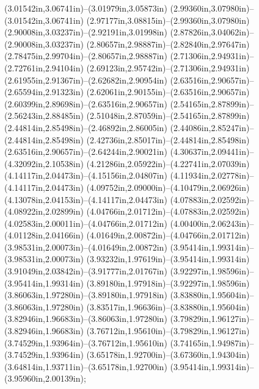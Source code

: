 (3.01542in,3.06741in)--(3.01979in,3.05873in) (2.99360in,3.07980in)--(3.01542in,3.06741in) (2.97177in,3.08815in)--(2.99360in,3.07980in) (2.90008in,3.03237in)--(2.92191in,3.01998in) (2.87826in,3.04062in)--(2.90008in,3.03237in) (2.80657in,2.98887in)--(2.82840in,2.97647in) (2.78475in,2.99704in)--(2.80657in,2.98887in) (2.71306in,2.94931in)--(2.72761in,2.94104in) (2.69123in,2.95742in)--(2.71306in,2.94931in) (2.61955in,2.91367in)--(2.62682in,2.90954in) (2.63516in,2.90657in)--(2.65594in,2.91323in) (2.62061in,2.90155in)--(2.63516in,2.90657in) (2.60399in,2.89698in)--(2.63516in,2.90657in) (2.54165in,2.87899in)--(2.56243in,2.88485in) (2.51048in,2.87059in)--(2.54165in,2.87899in) (2.44814in,2.85498in)--(2.46892in,2.86005in) (2.44086in,2.85247in)--(2.44814in,2.85498in) (2.42736in,2.85017in)--(2.44814in,2.85498in) (2.63516in,2.90657in)--(2.64244in,2.90021in) (4.30637in,2.09441in)--(4.32092in,2.10538in) (4.21286in,2.05922in)--(4.22741in,2.07039in) (4.14117in,2.04473in)--(4.15156in,2.04807in) (4.11934in,2.02778in)--(4.14117in,2.04473in) (4.09752in,2.09000in)--(4.10479in,2.06926in) (4.13078in,2.04153in)--(4.14117in,2.04473in) (4.07883in,2.02592in)--(4.08922in,2.02899in) (4.04766in,2.01712in)--(4.07883in,2.02592in) (4.02583in,2.00011in)--(4.04766in,2.01712in) (4.00400in,2.06243in)--(4.01128in,2.04166in) (4.01649in,2.00872in)--(4.04766in,2.01712in) (3.98531in,2.00073in)--(4.01649in,2.00872in) (3.95414in,1.99314in)--(3.98531in,2.00073in) (3.93232in,1.97619in)--(3.95414in,1.99314in) (3.91049in,2.03842in)--(3.91777in,2.01767in) (3.92297in,1.98596in)--(3.95414in,1.99314in) (3.89180in,1.97918in)--(3.92297in,1.98596in) (3.86063in,1.97280in)--(3.89180in,1.97918in) (3.83880in,1.95604in)--(3.86063in,1.97280in) (3.83517in,1.96636in)--(3.83880in,1.95604in) (3.82946in,1.96683in)--(3.86063in,1.97280in) (3.79829in,1.96127in)--(3.82946in,1.96683in) (3.76712in,1.95610in)--(3.79829in,1.96127in) (3.74529in,1.93964in)--(3.76712in,1.95610in) (3.74165in,1.94987in)--(3.74529in,1.93964in) (3.65178in,1.92700in)--(3.67360in,1.94304in) (3.64814in,1.93711in)--(3.65178in,1.92700in) (3.95414in,1.99314in)--(3.95960in,2.00139in);
